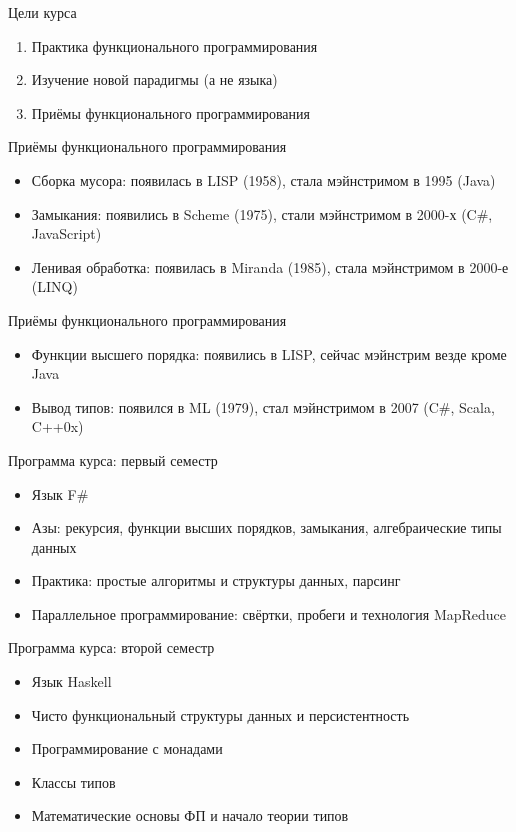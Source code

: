 \documentclass{beamer}
\begin{document}
\begin{frame}{Цели курса}
  \begin{enumerate}
  \item Практика функционального программирования
  \item Изучение новой парадигмы (а не языка)
  \item Приёмы функционального программирования
  \end{enumerate}
\end{frame}

\begin{frame}{Приёмы функционального программирования}
  \begin{itemize}
  \item Сборка мусора: появилась в LISP (1958), стала мэйнстримом в 1995 (Java)\pause
  \item Замыкания: появились в Scheme (1975), стали мэйнстримом в 2000-х (C\#, JavaScript)\pause
  \item Ленивая обработка: появилась в Miranda (1985), стала мэйнстримом в 2000-е (LINQ)
  \end{itemize}
\end{frame}

\begin{frame}{Приёмы функционального программирования}
  \begin{itemize}
  \item Функции высшего порядка: появились в LISP, сейчас мэйнстрим везде кроме Java\pause
  \item Вывод типов: появился в ML (1979), стал мэйнстримом в 2007 (C\#, Scala, C++0x)
  \end{itemize}
\end{frame}

\begin{frame}{Программа курса: первый семестр}
  \begin{itemize}
    \item Язык F\#\pause
    \item Азы: рекурсия, функции высших порядков, замыкания, алгебраические типы данных\pause
    \item Практика: простые алгоритмы и структуры данных, парсинг\pause
    \item Параллельное программирование: свёртки, пробеги и технология MapReduce
  \end{itemize}
\end{frame}

\begin{frame}{Программа курса: второй семестр}
  \begin{itemize}
    \item Язык Haskell\pause
    \item Чисто функциональный структуры данных и персистентность\pause
    \item Программирование с монадами\pause
    \item Классы типов\pause
    \item Математические основы ФП и начало теории типов
  \end{itemize}
\end{frame}
\end{document}
